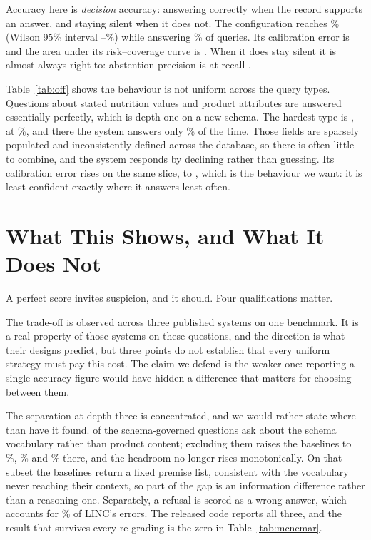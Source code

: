 \documentclass[conference]{IEEEtran}
\begin{document}
Accuracy here is \emph{decision} accuracy: answering correctly when the record
supports an answer, and staying silent when it does not. The configuration
reaches \OffAcc\% (Wilson 95\% interval \OffAccLo--\OffAccHi\%) while answering
\OffCoverage\% of queries. Its calibration error is \OffEce{} and the area under
its risk--coverage curve is \OffAurc{}. When it does stay silent it is almost
always right to: abstention precision is \OffAbstainPrec{} at recall
\OffAbstainRec{}.



Table~\ref{tab:off} shows the behaviour is not uniform across the \OffTypes{}
query types. Questions about stated nutrition values and product attributes are
answered essentially perfectly, which is depth one on a new schema. The hardest
type is \OffHardestType{}, at \OffHardestAcc\%, and there the system answers
only \OffHardestCoverage\% of the time. Those fields are sparsely populated and
inconsistently defined across the database, so there is often little to combine,
and the system responds by declining rather than guessing. Its calibration error
rises on the same slice, to \OffEceHardest{}, which is the behaviour we want: it
is least confident exactly where it answers least often.

\section{What This Shows, and What It Does Not}
\label{sec:limits}
A perfect score invites suspicion, and it should. Four qualifications matter.

The trade-off is observed across three published systems on one benchmark. It is
a real property of those systems on these questions, and the direction is what
their designs predict, but three points do not establish that every uniform
strategy must pay this cost. The claim we defend is the weaker one: reporting a
single accuracy figure would have hidden a difference that matters for choosing
between them.

The separation at depth three is concentrated, and we would rather state where
than have it found. \ScopeNarrow{} of the \NLogic{} schema-governed questions
ask about the schema vocabulary rather than product content; excluding them
raises the baselines to \CleanLongCtxLogic\%, \CleanLINCLogic\% and
\CleanLogicLMLogic\% there, and the headroom no longer rises monotonically. On
that subset the baselines return a fixed premise list, consistent with the
vocabulary never reaching their context, so part of the gap is an information
difference rather than a reasoning one. Separately, a refusal is scored as a
wrong answer, which accounts for \AbstainShareLINC\% of LINC's errors. The
released code reports all three, and the result that survives every re-grading
is the zero in Table~\ref{tab:mcnemar}.
\end{document}
